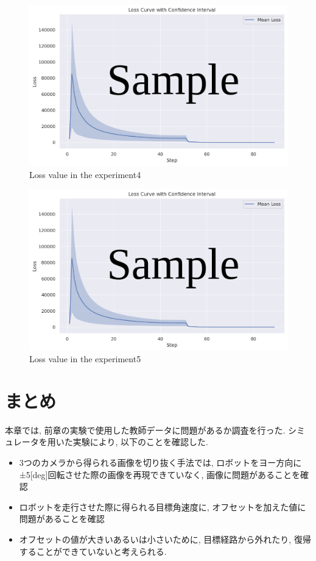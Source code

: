 \begin{figure}[h]
  \centering
  \includegraphics[keepaspectratio, scale=0.55]{images/sample.png}
  \caption{Loss value in the experiment4}
  \label{Fig:sample4}
\end{figure}

\begin{figure}[h]
  \centering
  \includegraphics[keepaspectratio, scale=0.55]{images/sample.png}
  \caption{Loss value in the experiment5}
  \label{Fig:sample5}
\end{figure}

\newpage
\section{まとめ}
本章では, 前章の実験で使用した教師データに問題があるか調査を行った. シミュレータを用いた実験により, 以下のことを確認した.

\begin{itemize}
  \item 3つのカメラから得られる画像を切り抜く手法では, ロボットをヨー方向に±5[deg]回転させた際の画像を再現できていなく, 画像に問題があることを確認
  \item ロボットを走行させた際に得られる目標角速度に, オフセットを加えた値に問題があることを確認
  \item オフセットの値が大きいあるいは小さいために, 目標経路から外れたり, 復帰することができていないと考えられる.
\end{itemize}

